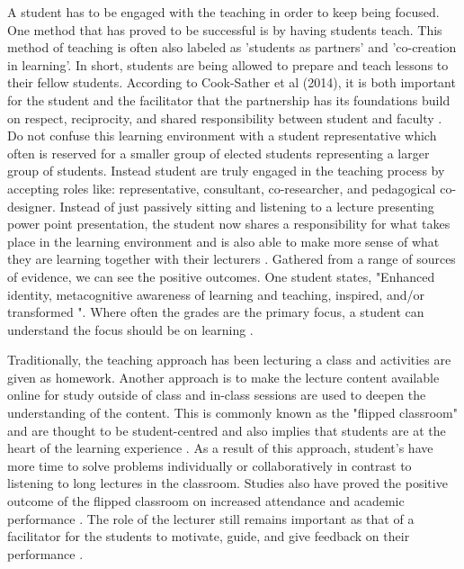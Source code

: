 \documentclass[12pt]{article}
\begin{document}
A student has to be engaged with the teaching in order to keep being focused. One method that has proved to be successful is by having students teach. This method of teaching is often also labeled as 'students as partners' and 'co-creation in learning'. In short, students are being allowed to prepare and teach lessons to their fellow students. According to Cook-Sather et al (2014), it is both important for the student and the facilitator that the partnership has its foundations build on respect, reciprocity, and shared responsibility between student and faculty \cite{engaging-students}. Do not confuse this learning environment with a student representative which often is reserved for a smaller group of elected students representing a larger group of students. Instead student are truly engaged in the teaching process by accepting roles like: representative, consultant, co-researcher, and pedagogical co-designer. Instead of just passively sitting and listening to a lecture presenting power point presentation, the student now shares a responsibility for what takes place in the learning environment and is also able to make more sense of what they are learning together with their lecturers \cite{cocreation-in-learning}. Gathered from a range of sources of evidence, \cite{cocreation-in-learning} we can see the positive outcomes. One student states, "Enhanced identity, metacognitive awareness of learning and teaching, inspired, and/or transformed \cite{investigation-of-cocreation}". Where often the grades are the primary focus, a student can understand the focus should be on learning \cite{voices-in-the-study-of-teaching-and-learning}. 

Traditionally, the teaching approach has been lecturing a class and activities are given as homework. Another approach is to make the lecture content available online for study outside of class and in-class sessions are used to deepen the understanding of the content. This is commonly known as the "flipped classroom" and are thought to be student-centred and also implies that students are at the heart of the learning experience \cite{understanding-flipped-classroom}. As a result of this approach, student's have more time to solve problems individually or collaboratively in contrast to listening to long lectures in the classroom. Studies also have proved the positive outcome of the flipped classroom on increased attendance and academic performance \cite{the-flipped-classroom}. The role of the lecturer still remains important as that of a facilitator for the students to motivate, guide, and give feedback on their performance \cite{flip-your-classroom}. 


\newpage



\end{document}
